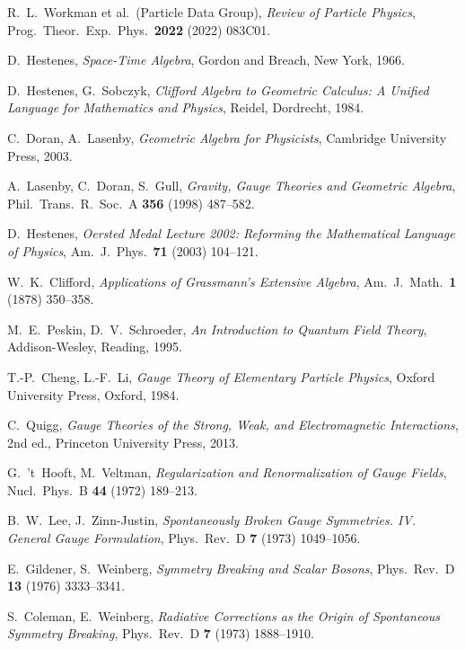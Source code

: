 \documentclass[11pt,a4paper]{article}
\theoremstyle{definition}
\theoremstyle{plain}
\theoremstyle{remark}
\begin{document}
\begin{thebibliography}{99}
R.~L.~Workman et al.\ (Particle Data Group), \emph{Review of Particle Physics}, Prog.\ Theor.\ Exp.\ Phys.\ \textbf{2022} (2022) 083C01.

D.~Hestenes, \emph{Space-Time Algebra}, Gordon and Breach, New York, 1966.

D.~Hestenes, G.~Sobczyk, \emph{Clifford Algebra to Geometric Calculus: A Unified Language for Mathematics and Physics}, Reidel, Dordrecht, 1984.

C.~Doran, A.~Lasenby, \emph{Geometric Algebra for Physicists}, Cambridge University Press, 2003.

A.~Lasenby, C.~Doran, S.~Gull, \emph{Gravity, Gauge Theories and Geometric Algebra}, Phil.\ Trans.\ R.\ Soc.\ A \textbf{356} (1998) 487--582.

D.~Hestenes, \emph{Oersted Medal Lecture 2002: Reforming the Mathematical Language of Physics}, Am.\ J.\ Phys.\ \textbf{71} (2003) 104--121.

W.~K.~Clifford, \emph{Applications of Grassmann's Extensive Algebra}, Am.\ J.\ Math.\ \textbf{1} (1878) 350--358.

M.~E.~Peskin, D.~V.~Schroeder, \emph{An Introduction to Quantum Field Theory}, Addison-Wesley, Reading, 1995.

T.-P.~Cheng, L.-F.~Li, \emph{Gauge Theory of Elementary Particle Physics}, Oxford University Press, Oxford, 1984.

C.~Quigg, \emph{Gauge Theories of the Strong, Weak, and Electromagnetic Interactions}, 2nd ed., Princeton University Press, 2013.

G.~'t~Hooft, M.~Veltman, \emph{Regularization and Renormalization of Gauge Fields}, Nucl.\ Phys.\ B \textbf{44} (1972) 189--213.

B.~W.~Lee, J.~Zinn-Justin, \emph{Spontaneously Broken Gauge Symmetries. IV. General Gauge Formulation}, Phys.\ Rev.\ D \textbf{7} (1973) 1049--1056.

E.~Gildener, S.~Weinberg, \emph{Symmetry Breaking and Scalar Bosons}, Phys.\ Rev.\ D \textbf{13} (1976) 3333--3341.

S.~Coleman, E.~Weinberg, \emph{Radiative Corrections as the Origin of Spontaneous Symmetry Breaking}, Phys.\ Rev.\ D \textbf{7} (1973) 1888--1910.


\end{thebibliography}
\end{document}
